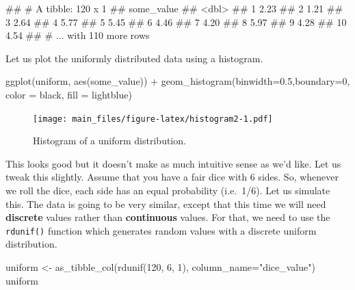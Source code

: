 \documentclass[
]{book}
\newenvironment{Shaded}{\begin{snugshade}}{\end{snugshade}}
\newcommand{\AttributeTok}[1]{\textcolor[rgb]{0.77,0.63,0.00}{#1}}
\newcommand{\DecValTok}[1]{\textcolor[rgb]{0.00,0.00,0.81}{#1}}
\newcommand{\FloatTok}[1]{\textcolor[rgb]{0.00,0.00,0.81}{#1}}
\newcommand{\FunctionTok}[1]{\textcolor[rgb]{0.00,0.00,0.00}{#1}}
\newcommand{\NormalTok}[1]{#1}
\newcommand{\OtherTok}[1]{\textcolor[rgb]{0.56,0.35,0.01}{#1}}
\newcommand{\SpecialCharTok}[1]{\textcolor[rgb]{0.00,0.00,0.00}{#1}}
\newcommand{\StringTok}[1]{\textcolor[rgb]{0.31,0.60,0.02}{#1}}
\begin{document}
\begin{Shaded}
\begin{Highlighting}[]
\NormalTok{\#\# \# A tibble: 120 x 1}
\NormalTok{\#\#    some\_value}
\NormalTok{\#\#         \textless{}dbl\textgreater{}}
\NormalTok{\#\#  1       2.23}
\NormalTok{\#\#  2       1.21}
\NormalTok{\#\#  3       2.64}
\NormalTok{\#\#  4       5.77}
\NormalTok{\#\#  5       5.45}
\NormalTok{\#\#  6       4.46}
\NormalTok{\#\#  7       4.20}
\NormalTok{\#\#  8       5.97}
\NormalTok{\#\#  9       4.28}
\NormalTok{\#\# 10       4.54}
\NormalTok{\#\# \# ... with 110 more rows}
\end{Highlighting}
\end{Shaded}

Let us plot the uniformly distributed data using a histogram.

\begin{Shaded}
\begin{Highlighting}[]
\FunctionTok{ggplot}\NormalTok{(uniform, }\FunctionTok{aes}\NormalTok{(some\_value)) }\SpecialCharTok{+}
        \FunctionTok{geom\_histogram}\NormalTok{(}\AttributeTok{binwidth=}\FloatTok{0.5}\NormalTok{,}\AttributeTok{boundary=}\DecValTok{0}\NormalTok{,}
                       \AttributeTok{color =} \StringTok{\textquotesingle{}black\textquotesingle{}}\NormalTok{,}
                       \AttributeTok{fill =} \StringTok{\textquotesingle{}lightblue\textquotesingle{}}\NormalTok{)}
\end{Highlighting}
\end{Shaded}

\begin{figure}
\centering
\texttt{[image: main\_files/figure-latex/histogram2-1.pdf]}
\caption{\label{fig:histogram2}Histogram of a uniform distribution.}
\end{figure}

This looks good but it doesn't make as much intuitive sense as we'd like. Let us tweak this slightly. Assume that you have a fair dice with 6 sides. So, whenever we roll the dice, each side has an equal probability (i.e.~1/6). Let us simulate this. The data is going to be very similar, except that this time we will need \textbf{discrete} values rather than \textbf{continuous} values. For that, we need to use the \texttt{rdunif()} function which generates random values with a discrete uniform distribution.

\begin{Shaded}
\begin{Highlighting}[]
\NormalTok{uniform }\OtherTok{\textless{}{-}} \FunctionTok{as\_tibble\_col}\NormalTok{(}\FunctionTok{rdunif}\NormalTok{(}\DecValTok{120}\NormalTok{, }\DecValTok{6}\NormalTok{, }\DecValTok{1}\NormalTok{), }\AttributeTok{column\_name=}\StringTok{"dice\_value"}\NormalTok{)}
\NormalTok{uniform}
\end{Highlighting}
\end{Shaded}
\end{document}
